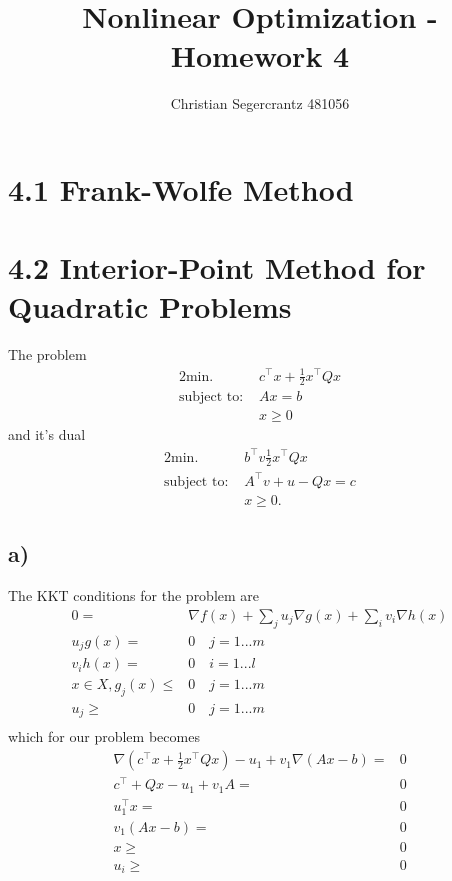 \documentclass{article}
\title{Nonlinear Optimization - Homework 4}
\author{Christian Segercrantz 481056}
\begin{document}
	\maketitle
	\pagebreak
\section*{4.1 Frank-Wolfe Method}
\section*{4.2 Interior-Point Method for Quadratic Problems}
	The problem
	\begin{alignat}{2}
		\text{min. } & c^\top x + \frac{1}{2}x^\top Q x \\
		\text{subject to: } & Ax = b \label{eq:4.1_g1_primal}\\
		&x \geq 0
	\end{alignat}
	and it's dual
	\begin{alignat}{2}
		\text{min. } & b^\top v \frac{1}{2}x^\top Q x \\
		\text{subject to: } & A^\top v + u - Qx = c \label{eq:4.1_g1_dual}\\
		&x \geq 0.
	\end{alignat}
\subsection*{a)}
	The KKT conditions for the problem are
	\begin{align}
		0=& \nabla f(x) + \sum_j u_j \nabla g(x) + \sum_i v_i\nabla h(x) \\
		u_jg(x) =& 0 \quad j=1...m \\
		v_ih(x) =& 0 \quad i=1...l \\
		x\in X, g_j(x)\leq& 0 \quad j=1...m \\
		u_j\geq& 0 \quad j=1...m \\
	\end{align}
	which for our problem becomes
	\begin{align}
		\nabla (c^\top x + \frac{1}{2}x^\top Q x) - u_1 + v_1 \nabla(Ax-b) =& 0\\
		c^\top+Qx - u_1 + v_1A =& 0 \\
		u_1^\top x =& 0 \\
		v_1(Ax-b) =& 0  \\
		x \geq& 0 \\
		u_i\geq& 0  \\
	\end{align}
\end{document}

